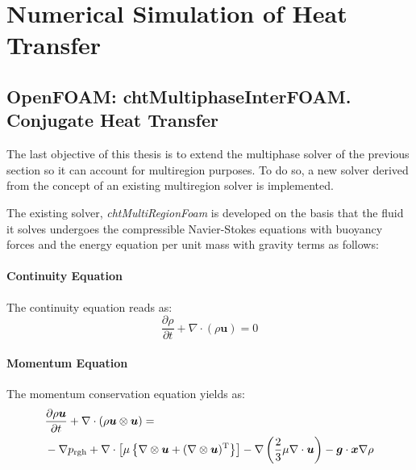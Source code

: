 \chapter{Numerical Simulation of Heat Transfer} %

\label{Chapter4}

\section{OpenFOAM: chtMultiphaseInterFOAM. Conjugate Heat Transfer}
\setlength{\parindent}{0.5cm} The last objective of this thesis is to extend the multiphase solver of the previous section so it can account for multiregion purposes. To do so, a new solver derived from the concept of an existing multiregion solver is implemented. 

\noindent The existing solver, \textit{chtMultiRegionFoam} is developed on the basis that the fluid it solves undergoes the compressible Navier-Stokes equations with buoyancy forces and the energy equation per unit mass with gravity terms as follows:
\subsubsection*{Continuity Equation}
The continuity equation reads as:
\begin{equation}
	\frac{\partial \rho}{\partial t}+\nabla \cdot(\rho \boldsymbol{u})=0
	\label{4.1}
\end{equation}
\subsubsection*{Momentum Equation}
The momentum conservation equation yields as:
\begin{equation}
	\begin{aligned}
		&\frac{\partial \rho \boldsymbol{u}}{\partial t}+\nabla \cdot(\rho \boldsymbol{u} \otimes \boldsymbol{u})=\\
		&-\nabla p_{\mathrm{rgh}}+\nabla \cdot\left[\mu\left\{\nabla \otimes \boldsymbol{u}+(\nabla \otimes \boldsymbol{u})^{\mathrm{T}}\right\}\right]
		-\nabla\left(\frac{2}{3} \mu \nabla \cdot \boldsymbol{u}\right)-\boldsymbol{g} \cdot \boldsymbol{x} \nabla \rho
	\end{aligned}
	\centering
	\label{4.2}
\end{equation}
